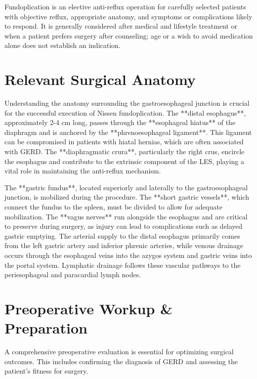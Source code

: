 Fundoplication is an elective anti-reflux operation for carefully selected patients with objective reflux, appropriate anatomy, and symptoms or complications likely to respond. It is generally considered after medical and lifestyle treatment or when a patient prefers surgery after counseling; age or a wish to avoid medication alone does not establish an indication.

\section*{Relevant Surgical Anatomy}
Understanding the anatomy surrounding the gastroesophageal junction is crucial for the successful execution of Nissen fundoplication. The **distal esophagus**, approximately 2-4 cm long, passes through the **esophageal hiatus** of the diaphragm and is anchored by the **phrenoesophageal ligament**. This ligament can be compromised in patients with hiatal hernias, which are often associated with GERD. The **diaphragmatic crura**, particularly the right crus, encircle the esophagus and contribute to the extrinsic component of the LES, playing a vital role in maintaining the anti-reflux mechanism.

The **gastric fundus**, located superiorly and laterally to the gastroesophageal junction, is mobilized during the procedure. The **short gastric vessels**, which connect the fundus to the spleen, must be divided to allow for adequate mobilization. The **vagus nerves** run alongside the esophagus and are critical to preserve during surgery, as injury can lead to complications such as delayed gastric emptying. The arterial supply to the distal esophagus primarily comes from the left gastric artery and inferior phrenic arteries, while venous drainage occurs through the esophageal veins into the azygos system and gastric veins into the portal system. Lymphatic drainage follows these vascular pathways to the periesophageal and paracardial lymph nodes.

\section*{Preoperative Workup \& Preparation}
A comprehensive preoperative evaluation is essential for optimizing surgical outcomes. This includes confirming the diagnosis of GERD and assessing the patient's fitness for surgery.


